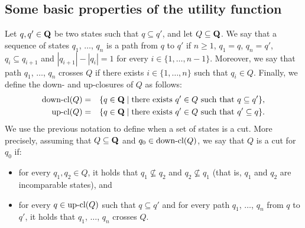 


\subsection{Some basic properties of the utility function}
Let $q, q' \in \mathbf{Q}$ be two states such that $q \subseteq q'$, and let $Q \subseteq \mathbf{Q}$. We say that a sequence of states $q_1$, $\ldots$, $q_n$ is a path from $q$ to $q'$ if $n \geq 1$, $q_1 = q$, $q_n =q'$, $q_i \subseteq q_{i+1}$ and $|q_{i+1}| - |q_i| = 1$ for every $i \in \{1, \ldots, n-1\}$. Moreover, we say that path $q_1$, $\ldots$, $q_n$ crosses $Q$ if there exists $i \in \{1, \ldots, n\}$ such that $q_i \in Q$. Finally, we define the down- and up-closures of $Q$ as follows:
\begin{eqnarray*}
\text{\rm down-cl}(Q) &=& \{ q \in \mathbf{Q} \mid \text{there exists } q' \in Q \text{ such that } q \subseteq q'\},\\
\text{\rm up-cl}(Q) &=& \{ q \in \mathbf{Q} \mid \text{there exists } q' \in Q \text{ such that } q' \subseteq q\}.
\end{eqnarray*}
We use the previous notation to define when a set of states is a cut. More precisely, assuming that $Q \subseteq \mathbf{Q}$ and $q_0 \in \text{\rm down-cl}(Q)$, we say that $Q$ is a cut for $q_0$ if:
\begin{itemize}
\item for every $q_1, q_2 \in Q$, it holds that $q_1 \not\subseteq q_2$ and $q_2 \not\subseteq q_1$ (that is, $q_1$ and $q_2$ are incomparable states), and

\item for every $q \in \text{\rm up-cl}(Q)$ such that $q \subseteq q'$ and for every path $q_1$, $\ldots$, $q_n$ from $q$ to $q'$, it holds that $q_1$, $\ldots$, $q_n$ crosses $Q$.
\end{itemize}

